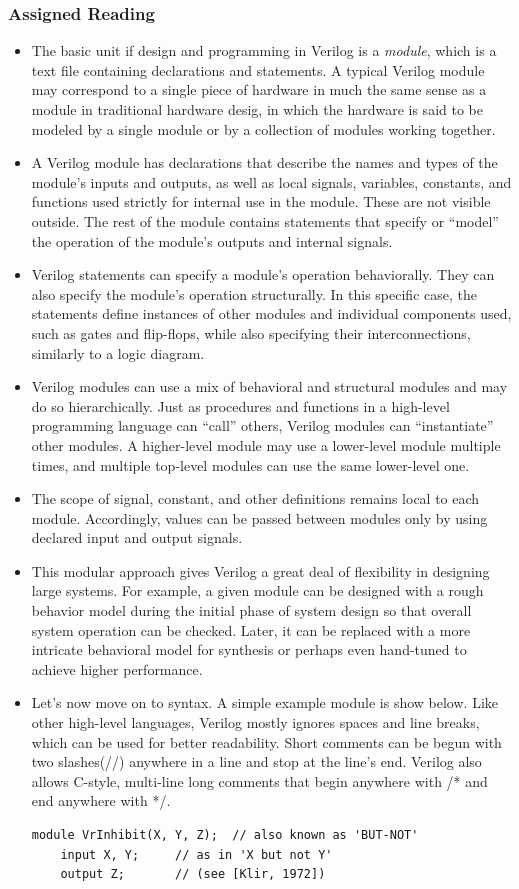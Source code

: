 \documentclass[10pt,a4paper]{article}
\begin{document}
\subsubsection{Assigned Reading}
\begin{itemize}
\item The basic unit if design and programming in Verilog is a \textit{module}, which is a text file containing declarations and statements. A typical Verilog module may correspond to a single piece of hardware in much the same sense as a module in traditional hardware desig, in which the hardware is said to be modeled by a single module or by a collection of modules working together. 
\item A Verilog module has declarations that describe the names and types of the module's inputs and outputs, as well as local signals, variables, constants, and functions used strictly for internal use in the module. These are not visible outside. The rest of the module contains statements that specify or ``model'' the operation of the module's outputs and internal signals. 
\item Verilog statements can specify a module's operation behaviorally. They can also specify the module's operation structurally. In this specific case, the statements define instances of other modules and individual components used, such as gates and flip-flops, while also specifying their interconnections, similarly to a logic diagram.
\item Verilog modules can use a mix of behavioral and structural modules and may do so hierarchically. Just as procedures and functions in a high-level programming language can ``call'' others, Verilog modules can ``instantiate'' other modules. A higher-level module may use a lower-level module multiple times, and multiple top-level modules can use the same lower-level one. 
\item The scope of signal, constant, and other definitions remains local to each module. Accordingly, values can be passed between modules only by using declared input and output signals. 
\item This modular approach gives Verilog a great deal of flexibility in designing large systems. For example, a given module can be designed with a rough behavior model during the initial phase of system design so that overall system operation can be checked. Later, it can be replaced with a more intricate behavioral model for synthesis or perhaps even hand-tuned to achieve higher performance. 
\item Let's now move on to syntax. A simple example module is show below. Like other high-level languages, Verilog mostly ignores spaces and line breaks, which can be used for better readability. Short comments can be begun with two slashes(//) anywhere in a line and stop at the line's end. Verilog also allows C-style, multi-line long comments that begin anywhere with /* and end anywhere with */.
\begin{lstlisting}
module VrInhibit(X, Y, Z);	// also known as 'BUT-NOT'
	input X, Y;		// as in 'X but not Y'
	output Z;		// (see [Klir, 1972])
	

\end{lstlisting}
\end{itemize}
\end{document}
